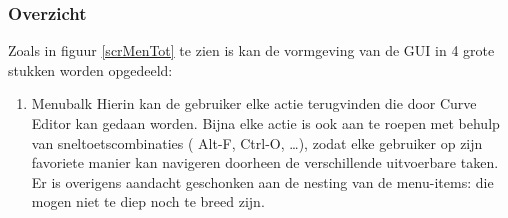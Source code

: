 \documentclass[a4paper,11pt,oneside, titlepage]{article}
\begin{document}
\subsubsection{Overzicht}
Zoals in figuur \ref{scrMenTot} te zien is kan de vormgeving van de GUI in 4 grote stukken worden opgedeeld:
\begin{enumerate}
\item Menubalk\newline
Hierin kan de gebruiker elke actie terugvinden die door Curve Editor kan gedaan worden.
Bijna elke actie is ook aan te roepen met behulp van sneltoetscombinaties ( Alt-F, Ctrl-O, \ldots ), zodat
elke gebruiker op zijn favoriete manier kan navigeren doorheen de verschillende uitvoerbare taken.
Er is overigens aandacht geschonken aan de nesting van de menu-items: die mogen niet te diep noch te breed zijn.


\end{enumerate}
\end{document}
